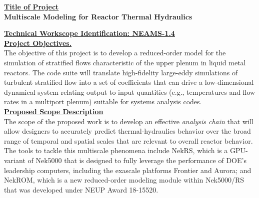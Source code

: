 
\vspace*{.0in} \noindent 
\underline{\textbf{Title of Project}} 
\\[-2ex]

\noindent
\textbf{Multiscale Modeling for Reactor Thermal Hydraulics}


\vspace*{.15in} \noindent 
\underline{\textbf{Technical Workscope Identification:  NEAMS-1.4}}
\\[-2ex]


\vspace*{.05in} \noindent 
\underline{\textbf{Project Objectives.}} 
\\[-2ex]

  The objective of this project is to develop a reduced-order model for the
simulation of stratified flows characteristic of the upper plenum in liquid
metal reactors.  The code suite will translate high-fidelity large-eddy
simulations of turbulent stratified flow into a set of coefficients that can
drive a low-dimensional dynamical system relating output to input quantities
(e.g., temperatures and flow rates in a multiport plenum) suitable for 
systems analysis codes.  
\\[0ex]

\vspace*{.0in}\noindent \underline{\textbf{Proposed Scope Description}}%
\\[-2ex]


The scope of the proposed work is to develop an effective {\em analysis chain}
that will allow designers to accurately predict thermal-hydraulics behavior
over the broad range of temporal and spatial scales that are relevant to overall
reactor behavior.
    The tools to tackle this multiscale phenomena include NekRS, which is 
a GPU-variant of Nek5000 that is designed to fully leverage the performance of
DOE's leadership computers, including the exascale platforms Frontier and
Aurora; and NekROM, which is a new reduced-order modeling module within
Nek5000/RS that was developed under NEUP Award 18-15520.






